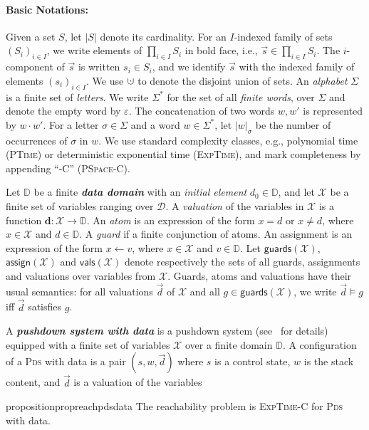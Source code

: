 \documentclass[runningheads,oribibl,]{article}
\newcommand{\veve}[1]{\ensuremath{\left| #1 \right|}}
\newcommand{\size}[1]{\veve{#1}}
\newcommand{\Dd}{\ensuremath{\mathcal{D}}\xspace}
\newcommand{\Xx}{\ensuremath{\mathcal{X}}\xspace}
\newcommand{\DD}{\ensuremath{\mathbb{D}}\xspace}
\DeclareMathOperator{\dotcup}{\mathaccent\cdot\cup}
\newcommand{\pds}{\textsc{Pds}\xspace}
\newcommand{\pspacecomplete}{\textsc{PSpace-C}\xspace}
\newcommand{\ptime}{\textsc{PTime}\xspace}
\newcommand{\dexptime}{\textsc{ExpTime}\xspace}
\newcommand{\dexptimecomplete}{\textsc{ExpTime-C}\xspace}
\newcommand{\Data}{\ensuremath{\vec{d}}}
\newcommand{\guardson}[1]{\ensuremath{\mathsf{guards}\left(#1\right)}}
\newcommand{\valof}[1]{\ensuremath{\mathsf{vals}\left(#1\right)}}
\newcommand{\assignon}[1]{\ensuremath{\mathsf{assign}\left(#1\right)}}
\begin{document}
\paragraph{\bf Basic Notations:} Given a set $S$, let $\size{S}$ denote its
cardinality. For an $I$-indexed family of sets $(S_i)_{i \in I}$, we
write elements of $\prod_{i \in I} S_i$ in bold face, i.e.,
$\vec{s}\in\prod_{i\in I} S_i$. The $i$-component of $\vec{s}$ is
written $s_i \in S_i$, and we identify $\vec{s}$ with the indexed
family of elements $(s_i)_{i \in I}$.
We use $\dotcup$ to denote the disjoint union of sets.
An \emph{alphabet} $\Sigma$ is a finite set of \emph{letters}. We
write $\Sigma^*$ for the set of all \emph{finite words}, over $\Sigma$
and denote the empty word by $\varepsilon$. The concatenation of two
words $w,w'$ is represented by $w\cdot w'$. For a letter
$\sigma\in\Sigma$ and a word $w\in\Sigma^*$, let $\veve{w}_\sigma$ be
the number of occurrences of $\sigma$ in $w$.
We use standard complexity classes, e.g., polynomial time
(\ptime) or deterministic exponential time (\dexptime), and mark
completeness by appending ``-C'' (\pspacecomplete).

Let $\DD$ be a finite \emph{\bf data domain}
with an \emph{initial element} $d_0\in\DD$, and let $\Xx$ be a finite
set of variables ranging over $\Dd$. A \emph{valuation} of the
variables in $\Xx$ is a function $\mathbf{d}: \Xx\rightarrow \DD$.  An
\emph{atom} is an expression of the form $x=d$ or $x\neq d$, where
$x\in\Xx$ and $d\in \DD$. A \emph{guard} if a finite conjunction of
atoms. An assignment is an expression of the form $x\gets v$, where
$x\in \Xx$ and $v\in \DD$. Let $\guardson{\Xx}$, $\assignon{\Xx}$ and
$\valof{\Xx}$ denote respectively the sets of all guards, assignments
and valuations over variables from $\Xx$. Guards, atoms and valuations
have their usual semantics: for all valuations $\Data$ of $\Xx$ and all
$g\in\guardson{\Xx}$, we write $\Data\models g$ iff $\Data$ satisfies
$g$.


\smallskip\noindent A \emph{\bf pushdown system with data} is a
pushdown system (see~\cite{bouajjani-a-1997-135-a} for details)
equipped with a finite set of variables $\Xx$ over a
finite domain $\DD$. A configuration of a \pds with data is a pair
$(s,w,\Data)$ where $s$ is a control state, $w$ is the stack content,
and $\Data$ is a valuation of the variables

\begin{restatable}{proposition}{propreachpdsdata}\label{prop:reach_pds_data}
  The reachability problem is \dexptimecomplete for \pds with data.
\end{restatable}
\end{document}

